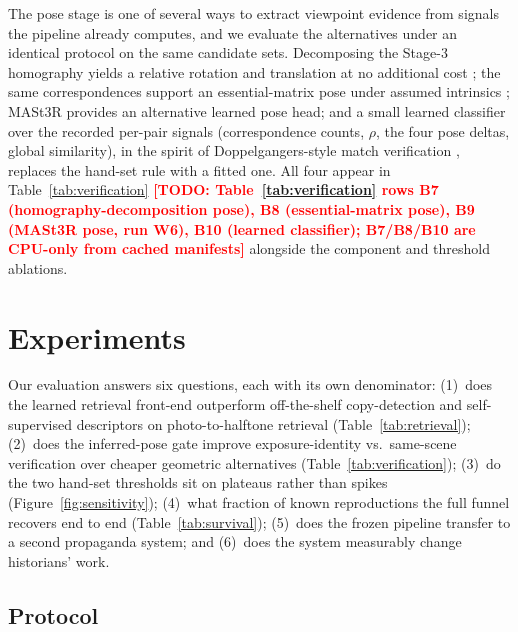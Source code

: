 \documentclass[letterpaper]{article} %
\newcommand{\todo}[1]{\textcolor{red}{\textbf{[TODO: #1]}}}
\begin{document}
The pose stage is one of several ways to extract viewpoint evidence from
signals the pipeline already computes, and we evaluate the alternatives
under an identical protocol on the same candidate sets. Decomposing the
Stage-3 homography yields a relative rotation and translation at no
additional cost \citep{malis2007homography}; the same correspondences
support an essential-matrix pose under assumed intrinsics
\citep{nister2004fivepoint}; MASt3R \citep{leroy2024mast3r} provides an
alternative learned pose head; and a small learned classifier over the
recorded per-pair signals (correspondence counts, $\rho$, the four pose
deltas, global similarity), in the spirit of Doppelgangers-style match
verification \citep{cai2023doppelgangers}, replaces the hand-set rule with
a fitted one. All four appear in Table~\ref{tab:verification}
\todo{Table~\ref{tab:verification} rows B7 (homography-decomposition pose),
B8 (essential-matrix pose), B9 (MASt3R pose, run W6), B10 (learned
classifier); B7/B8/B10 are CPU-only from cached manifests} alongside the
component and threshold ablations.

\section{Experiments}
\label{sec:evaluation}

Our evaluation answers six questions, each with its own denominator:
(1)~does the learned retrieval front-end outperform off-the-shelf
copy-detection and self-supervised descriptors on photo-to-halftone
retrieval (Table~\ref{tab:retrieval});
(2)~does the inferred-pose gate improve exposure-identity vs.\ same-scene
verification over cheaper geometric alternatives
(Table~\ref{tab:verification});
(3)~do the two hand-set thresholds sit on plateaus rather than spikes
(Figure~\ref{fig:sensitivity});
(4)~what fraction of known reproductions the full funnel recovers end to
end (Table~\ref{tab:survival});
(5)~does the frozen pipeline transfer to a second propaganda system; and
(6)~does the system measurably change historians' work.

\subsection{Protocol}
\label{sec:protocol}
\end{document}
